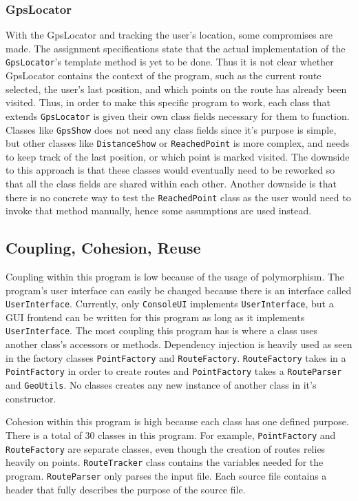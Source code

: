 \documentclass[a4paper, 12pt, titlepage]{article}
\newcommand{\code}[1]{\small\texttt{#1}\normalsize}
\begin{document}
\subsubsection{GpsLocator}

With the GpsLocator and tracking the user's location, some compromises are
made. The assignment specifications state that the actual implementation of the
\code{GpsLocator}'s template method is yet to be done. Thus it is not clear
whether GpsLocator contains the context of the program, such as the current
route selected, the user's last position, and which points on the route has
already been visited. Thus, in order to make this specific program to work,
each class that extends \code{GpsLocator} is given their own class fields
necessary for them to function. Classes like \code{GpsShow} does not need any
class fields since it's purpose is simple, but other classes like
\code{DistanceShow} or \code{ReachedPoint} is more complex, and needs to keep
track of the last position, or which point is marked visited. The downside to
this approach is that these classes would eventually need to be reworked so
that all the class fields are shared within each other. Another downside is
that there is no concrete way to test the \code{ReachedPoint} class as the user
would need to invoke that method manually, hence some assumptions are used
instead.


\subsection{Coupling, Cohesion, Reuse}

Coupling within this program is low because of the usage of polymorphism. The
program's user interface can easily be changed because there is an interface
called \code{UserInterface}. Currently, only \code{ConsoleUI} implements
\code{UserInterface}, but a GUI frontend can be written for this program as
long as it implements \code{UserInterface}. The most coupling this program has
is where a class uses another class's accessors or methods. Dependency
injection is heavily used as seen in the factory classes \code{PointFactory}
and \code{RouteFactory}. \code{RouteFactory} takes in a \code{PointFactory} in
order to create routes and \code{PointFactory} takes a \code{RouteParser} and
\code{GeoUtils}. No classes creates any new instance of another class in it's
constructor.

Cohesion within this program is high because each class has one defined
purpose. There is a total of 30 classes in this program. For example,
\code{PointFactory} and \code{RouteFactory} are separate classes, even though
the creation of routes relies heavily on points. \code{RouteTracker} class
contains the variables needed for the program. \code{RouteParser} only parses
the input file. Each source file contains a header that fully describes the
purpose of the source file.
\end{document}
